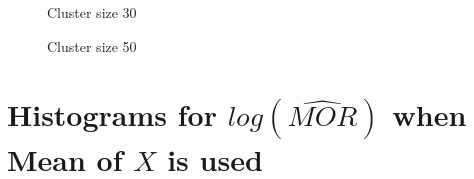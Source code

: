 \documentclass[
  letterpaper,
  DIV=11,
  numbers=noendperiod,
  titlepage]{scrartcl}
\begin{document}
\begin{figure}
\begin{minipage}[t]{0.24\linewidth}
{{}

\caption{Cluster size 30}

}

\end{minipage}%
%
\begin{minipage}[t]{0.24\linewidth}

{\centering 


\caption{Cluster size 50}

}

\end{minipage}%

\end{figure}

\newpage

\hypertarget{histograms-for-logwidehatmor-when-mean-of-x-is-used}{%
\section{\texorpdfstring{Histograms for \(log(\widehat{MOR})\) when Mean
of \(X\) is
used}{Histograms for log(\textbackslash widehat\{MOR\}) when Mean of X is used}}\label{histograms-for-logwidehatmor-when-mean-of-x-is-used}}
\end{document}
